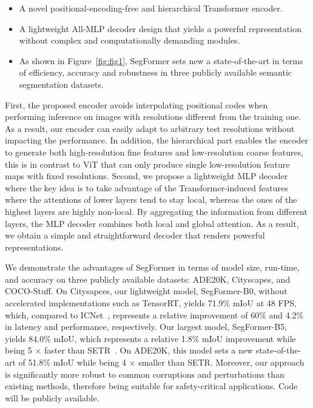\begin{itemize}[leftmargin=*]
\item A novel positional-encoding-free and hierarchical Transformer encoder.
\item A lightweight All-MLP decoder design that yields a powerful representation without complex and computationally demanding modules.
\item As shown in Figure~\ref{fig:fig1}, SegFormer sets new a state-of-the-art in terms of efficiency, accuracy and robustness in three publicly available semantic segmentation datasets.
\end{itemize}

First, the proposed encoder avoids interpolating positional codes when performing inference on images with resolutions different from the training one. As a result, our encoder can easily adapt to arbitrary test resolutions without impacting the performance. In addition, the hierarchical part enables the encoder to generate both high-resolution fine features and low-resolution coarse features, this is in contrast to ViT that can only produce single low-resolution feature maps with fixed resolutions. Second, we propose a lightweight MLP decoder where the key idea is to take advantage of the Transformer-induced features where the attentions of lower layers tend to stay local, whereas the ones of the highest layers are highly non-local. By aggregating the information from different layers, the MLP decoder combines both local and global attention. As a result, we obtain a simple and straightforward decoder that renders powerful representations.  

We demonstrate the advantages of SegFormer in terms of model size, run-time, and accuracy on three publicly available datasets: ADE20K, Cityscapes, and COCO-Stuff. On Citysapces, our lightweight model, SegFormer-B0, without accelerated implementations such as TensorRT, yields 71.9\% mIoU at 48 FPS, which, compared to ICNet~\cite{icnet}, represents a relative improvement of 60\% and 4.2\% in latency and performance, respectively. Our largest model, SegFormer-B5, yields 84.0\% mIoU, which represents a relative 1.8\% mIoU improvement while being 5 $\times$ faster than SETR~\cite{setr}. On ADE20K, this model sets a new state-of-the-art of 51.8\% mIoU while being 4 $\times$ smaller than SETR. Moreover, our approach is significantly more robust to common corruptions and perturbations than existing methods, therefore being suitable for safety-critical applications. Code will be publicly available.

